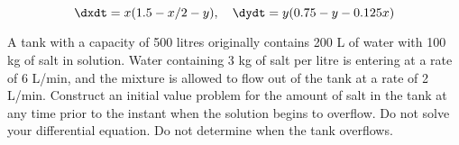 \documentclass[12pt]{exam}
\begin{document}
\begin{questions}
    $$\displaystyle \dxdt = x(1.5-x/2-y), \quad \dydt = y(0.75-y-0.125x)$$
    
    \question A tank with a capacity of 500 litres originally contains 200 L of water with 100 kg of salt in solution. Water containing 3 kg of salt per litre is entering at a rate of 6 L/min, and the mixture is allowed to flow out of the tank at a rate of 2 L/min. Construct an initial value problem for the amount of salt in the tank at any time prior to the instant when the solution begins to overflow. Do not solve your differential equation. Do not determine when the tank overflows.
    

    
\end{questions}

\newcommand{\LTNUM}{\stepcounter{NumberInTable}{\theNumberInTable.}}
\end{document}
